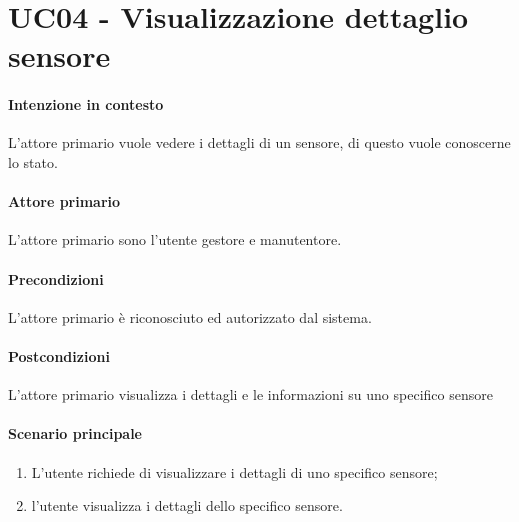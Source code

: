 \section{UC04 - Visualizzazione dettaglio sensore}\label{uc:04}
\paragraph{Intenzione in contesto} L'attore primario vuole vedere i dettagli di un sensore, di questo vuole conoscerne lo stato.
\paragraph{Attore primario} L'attore primario sono l'utente gestore e manutentore.
\paragraph{Precondizioni} L'attore primario è riconosciuto ed autorizzato dal sistema.
\paragraph{Postcondizioni} L'attore primario visualizza i dettagli e le informazioni su uno specifico sensore
\paragraph{Scenario principale}
\begin{enumerate}
    \item L'utente richiede di visualizzare i dettagli di uno specifico sensore;
    \item l'utente visualizza i dettagli dello specifico sensore.
\end{enumerate}